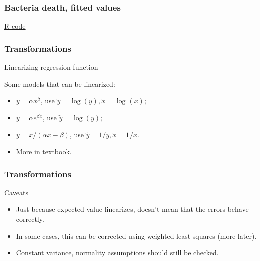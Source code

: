 \documentclass[handout]{beamer}
\begin{document}
   \begin{frame}
   \frametitle{Bacteria death, fitted values}
   \begin{center}
   \end{center}
   \href{http://stats191.stanford.edu/transformations.html#bacteria-example}{R code}
   \end{frame}


   \begin{frame} \frametitle{Transformations}

   \begin{block}
   {Linearizing regression function}

   Some models that can be linearized:
   \begin{itemize}

   \item $y=\alpha x^{\beta}$, use $\tilde{y}=\log(y), \tilde{x}=\log(x)$;

   \item $y=\alpha e^{\beta x}$, use $\tilde{y}=\log(y)$;

   \item $y=x/(\alpha x - \beta)$, use $\tilde{y}=1/y, \tilde{x}=1/x$.
   \item More in textbook.
   \end{itemize}
   \end{block}
   \end{frame}


   \begin{frame} \frametitle{Transformations}

   \begin{block}
   {Caveats}

   \begin{itemize}

   \item Just because expected value linearizes, doesn't
   mean that the errors behave correctly.

   \item In some cases, this can be corrected using
   weighted least squares (more later).


   \item Constant variance, normality assumptions should still be checked.
   \end{itemize}
   \end{block}
   \end{frame}
\end{document}
